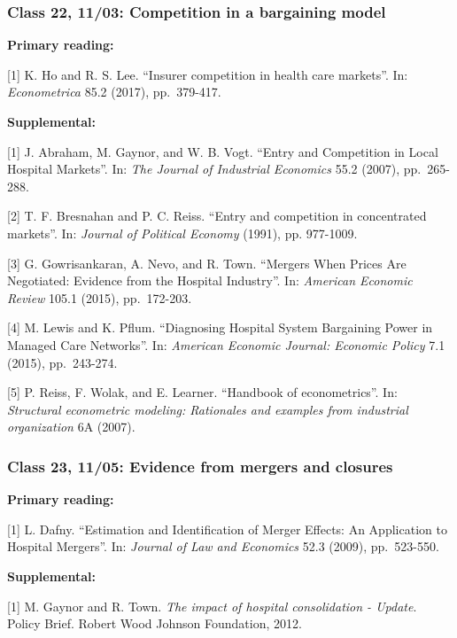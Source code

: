\documentclass[11pt,]{article}
\begin{document}
\hypertarget{class-22-1103-competition-in-a-bargaining-model}{%
\subsubsection{Class 22, 11/03: Competition in a bargaining
model}\label{class-22-1103-competition-in-a-bargaining-model}}

\textbf{Primary reading:}

{[}1{]} K. Ho and R. S. Lee. ``Insurer competition in health care
markets''. In: \emph{Econometrica} 85.2 (2017), pp.~379-417.

\textbf{Supplemental:}

{[}1{]} J. Abraham, M. Gaynor, and W. B. Vogt. ``Entry and Competition
in Local Hospital Markets''. In: \emph{The Journal of Industrial
Economics} 55.2 (2007), pp.~265-288.

{[}2{]} T. F. Bresnahan and P. C. Reiss. ``Entry and competition in
concentrated markets''. In: \emph{Journal of Political Economy} (1991),
pp. 977-1009.

{[}3{]} G. Gowrisankaran, A. Nevo, and R. Town. ``Mergers When Prices
Are Negotiated: Evidence from the Hospital Industry''. In:
\emph{American Economic Review} 105.1 (2015), pp.~172-203.

{[}4{]} M. Lewis and K. Pflum. ``Diagnosing Hospital System Bargaining
Power in Managed Care Networks''. In: \emph{American Economic Journal:
Economic Policy} 7.1 (2015), pp.~243-274.

{[}5{]} P. Reiss, F. Wolak, and E. Learner. ``Handbook of
econometrics''. In: \emph{Structural econometric modeling: Rationales
and examples from industrial organization} 6A (2007).

\hypertarget{class-23-1105-evidence-from-mergers-and-closures}{%
\subsubsection{Class 23, 11/05: Evidence from mergers and
closures}\label{class-23-1105-evidence-from-mergers-and-closures}}

\textbf{Primary reading:}

{[}1{]} L. Dafny. ``Estimation and Identification of Merger Effects: An
Application to Hospital Mergers''. In: \emph{Journal of Law and
Economics} 52.3 (2009), pp.~523-550.

\textbf{Supplemental:}

{[}1{]} M. Gaynor and R. Town. \emph{The impact of hospital
consolidation - Update}. Policy Brief. Robert Wood Johnson Foundation,
2012.
\end{document}
